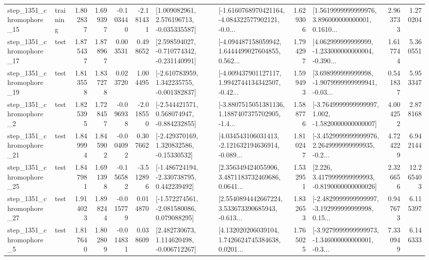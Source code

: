\begin{tabular}{llrrrrllrlrr}
 step\_1351\_chromophore\_15 &  training &      1.802837 &    1.699397 &     -0.103440 & -2.181431 &    [1.009082961, 2.576196713, -0.035335587] &  [-1.6160768970421164, -4.084322577902121, -0.0... &       1.629306 &  [1.5619999999999976, 3.896000000000001, 0.1610... &            2.963733 &          1.270204 \\
 step\_1351\_chromophore\_17 &      test &      1.875437 &    1.878967 &      0.003531 &  0.498652 &   [2.598594027, -0.710774342, -0.231140991] &  [-4.094487158059942, 1.6444499027604855, 0.562... &       1.794297 &  [4.062999999999999, -1.233000000000004, -0.390... &            1.617744 &          5.360551 \\
 step\_1351\_chromophore\_19 &      test &      1.813558 &    1.837278 &      0.023720 &  1.004495 &   [-2.610783959, 1.342235755, -0.001382837] &  [-4.009437901127117, 1.9942744134342507, -0.42... &       1.599493 &  [3.698999999999998, -1.9079999999999941, -0.03... &            0.541837 &          5.953347 \\
  step\_1351\_chromophore\_2 &      test &      1.825395 &    1.728457 &     -0.096938 & -2.018550 &   [-2.544421571, 0.568074947, -0.884232855] &  [-3.8807515051381136, 1.1887407375702905, -1.4... &       1.588776 &  [-3.7649999999999997, 1.002, -1.5820000000000007] &            4.004252 &          2.878168 \\
 step\_1351\_chromophore\_21 &      test &      1.849994 &    1.845902 &     -0.004092 &  0.307662 &    [-2.429370169, 1.320832586, -0.15330532] &  [4.034543106031413, -2.121632194636914, -0.089... &       1.810247 &  [-3.4529999999999976, 2.2649999999999935, -0.2... &            4.724229 &          6.942144 \\
 step\_1351\_chromophore\_25 &      test &      1.847981 &    1.691398 &     -0.156582 & -3.512896 &   [-1.486724194, -2.330738795, 0.442239492] &  [2.356349424055906, 3.4871183732469686, 0.0641... &       1.532951 &   [2.226, 3.4179999999999993, -0.8190000000000026] &            2.326656 &         12.265403 \\
 step\_1351\_chromophore\_27 &      test &      1.914023 &    1.898244 &     -0.015779 &  0.014870 &   [-1.572274561, -2.081580086, 0.079088295] &  [2.5540894442667224, 3.533673390685943, -0.613... &       1.832653 &  [-2.4829999999999997, -3.192999999999998, 0.15... &            0.947673 &          6.115397 \\
  step\_1351\_chromophore\_5 &      test &      1.817640 &    1.802809 &     -0.014831 &  0.038609 &    [2.482730673, 1.114620498, -0.006712267] &  [4.132020206039104, 1.7426624745384638, 0.0201... &       1.765025 &  [-3.9279999999999973, -1.346000000000001, -0.3... &            7.330949 &          6.146333 \\

\end{tabular}
